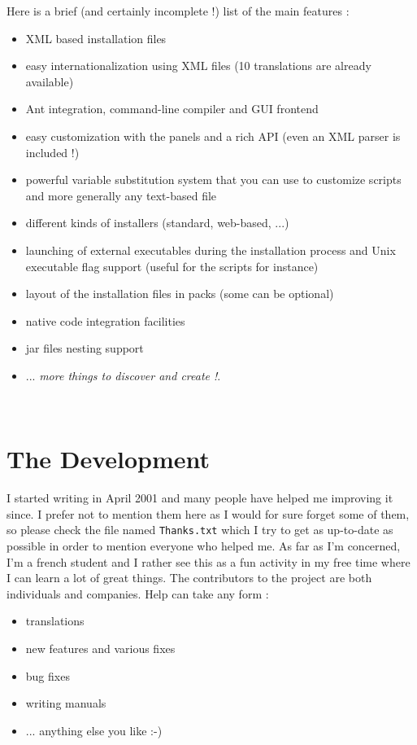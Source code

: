 Here is a brief (and certainly incomplete !) list of the main \IzPack features :
\begin{itemize}
	\item XML based installation files
	\item easy internationalization using XML files (10 translations are already
	available)
	\item Ant integration, command-line compiler and GUI frontend
	\item easy customization with the panels and a rich API (even an XML parser is
	included !)
	\item powerful variable substitution system that you can use to customize
	scripts and more generally any text-based file
	\item different kinds of installers (standard, web-based, ...)
	\item launching of external executables during the installation process and Unix
	executable flag support (useful for the scripts for instance)
	\item layout of the installation files in packs (some can be optional)
	\item native code integration facilities
	\item jar files nesting support
	\item ... \textsl{more things to discover and create !}.
\end{itemize}\

\section*{The Development}

I started writing \IzPack in April 2001 and many people have helped me
improving it since. I prefer not to mention them here as I would for sure forget
some of them, so please check the file named \texttt{Thanks.txt} which I try to
get as up-to-date as possible in order to mention everyone who helped me. As far
as I'm concerned, I'm a french student and I rather see this as a fun activity
in my free time where I can learn a lot of great things. The contributors to the
project are both individuals and companies. Help can take any form :
\begin{itemize}
	\item translations
	\item new features and various fixes
	\item bug fixes
	\item writing manuals
	\item ... anything else you like :-)
\end{itemize}\

